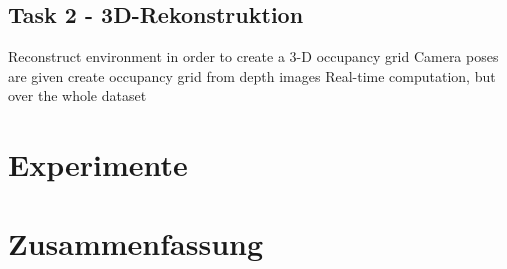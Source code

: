 \documentclass[12pt,titlepage, a4paper]{article}
\begin{document}
				
\subsection{Task 2 - 3D-Rekonstruktion}

Reconstruct environment in order to create a 3-D occupancy grid
Camera poses are given
create occupancy grid from depth images
Real-time computation, but over the whole dataset



\section{Experimente}




\section{Zusammenfassung}
\end{document}
